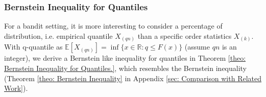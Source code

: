 \subsubsection{Bernstein Inequality for Quantiles}
\label{subsec: concentration inequalities for medians}

\begin{table}[!ht]
\renewcommand{\arraystretch}{2}
\centering
{}
\caption{Expected sub-optimal draws and regret bound for special case distributions, where $C_{i}$ is shown in the last row, and $\xi = \left(1 + \frac{\pi^2}{3}\right) \left(\sum_{j=1}^K \Delta_{j}\right)$. See Appendix \ref{app-sec: special case} for definitions of special case distributions. }
\label{table: Summary for policies and bounds.}
\end{table}


For a bandit setting, it is more interesting to consider a percentage of distribution, i.e. empirical quantile $X_{(qn)}$ than a specific order statistics $X_{(k)}$.
With q-quantile as $\mathbb{E}[X_{(qn)}] = \inf \{x \in \mathbb{R} : q \leq F\left(x\right)\}$ (assume $qn$ is an integer), we derive a Bernstein like inequality for quantiles in Theorem \ref{theo: Bernstein Inequality for Quantiles.}, which resembles the Bernstein inequality (Theorem \ref{theo: Bernstein Inequality} in Appendix \ref{sec: Comparison with Related Work}).

